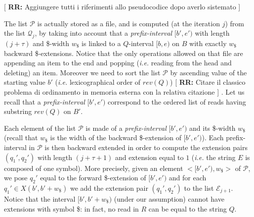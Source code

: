 \documentclass[runningheads,envcountsame,a4paper]{llncs}
\newcommand{\notaestesa}[2]{%
 \marginpar{\color{red!75!black}\textbf{\texttimes}}%
 {\color{red!75!black}%
 [\,\textbullet\,\textsf{\textbf{#1:}} %
 \textsf{\footnotesize#2}\,\textbullet\,]}%
}
\newcommand{\ie}{\textit{i.e.}\xspace}
\begin{document}
\begin{comment}
More precisely, the steps .... in algorithm \emph{processLinkedInterval}
directly provides the values of the new $\sigma Q$-interval and such
value is appended at the end of the new updated list (or file), in order
to maintain the lexicographic ordering.
In fact, the sorted property of the file, allows to update the files
while reading the files themselves, thus minimizing the operations on the
file.
\notaestesa{PB}{nota bene il passo dal 3 al 9 non si capisce come sia
implementato in termini di memoria esterna ed interna - io sarei per
descrivere la procedura processLinkedInterval- dettagliandola rispetto
ai linked intervals, che però vanno definiti prima, in termini
costruttivi}.


Intervals $[b,e)$ in $\mathcal{Q}_j$ represent common strings $Q$ of
length $(j+\tau)$.
Their link to the $rev(Q)$-interval $[b',e')$ on $B'$ is easily
maintained (during the backward extension of the intervals of length
$(j+\tau-1)$ to produce the intervals in $Q_j$) by Prop.~\ref{proposition:linked-intervals}.
This list is partioned into $|\Sigma|$ files according to the starting
symbol of $Q$, and maintained sorted by ascending value of the start
$b$.
\end{comment}

\notaestesa{RR}{Aggiungere tutti i riferimenti allo pseudocodice dopo averlo sistemato}
The list $\mathcal{P}$ is actually stored as a file, and is computed (at the iteration $j$) from the list $\mathcal{Q}_j$, by
taking into account that a
\emph{prefix-interval} $[b', e')$ with length $(j+\tau)$ and  \$-width $w_\$$ is linked to a $Q$-interval $[b, e)$ on $B$ with exactly $w_\$$ backward \$-extensions.
Notice that the only operations allowed on that file are appending an item to
the end and popping (\ie reading from the head and deleting) an item.
Moreover we need to sort the list $\mathcal{P}$ by ascending value of the starting
value $b'$ (\ie lexicographical order of $rev(Q)$) \notaestesa{RR}{Citare il classico problema di ordinamento in memoria esterna con la relativa citazione}.
Let us recall that a \emph{prefix-interval} $[b', e')$ correspond to
the ordered list of reads having substring $rev(Q)$ on $B'$.

Each element of the list $\mathcal{P}$ is made of a  \emph{prefix-interval} $[b',e')$
and its \$-width $w_\$$ (recall that $w_\$$ is the width of the backward \$-extension of $[b',e')$). %
Each prefix-interval in $\mathcal{P}$ is then backward
extended in order to compute the extension pairs $(q_{1}', q_{2}')$ with
length $(j+\tau+1)$ and extension equal to $1$ (\ie the string $E$ is composed of one symbol).
More precisely, given an element  $<[b',e'), w_\$>$ of $\mathcal{P}$,
we pose $q_{2}'$ equal to the forward \$-extension of  $[b',e')$ and
for each $q_{1}'\in X(b',b'+w_\$)$ we add the extension pair  $(q_{1}',q_{2}')$ to
the list $\mathcal{E}_{j+1}$.
Notice that the interval $[b', b'+w_\$)$ (under our assumption) cannot have
extensions with symbol \$: in fact, no read in $R$ can be equal to the string $Q$.
\end{document}
